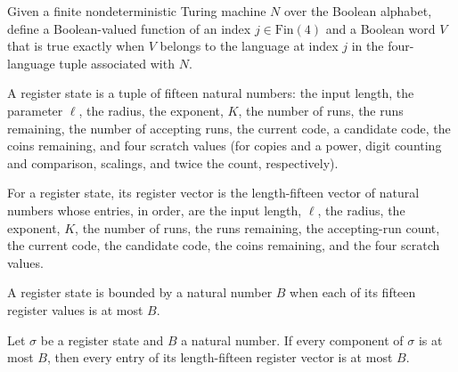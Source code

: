 \begin{definition}
\label{Randomized.PolyAmp.ampOr}
\leanok
{}
Given a finite nondeterministic Turing machine $N$ over the Boolean alphabet, define a
Boolean-valued function of an index $j\in\mathrm{Fin}(4)$ and a Boolean word $V$ that is true
exactly when $V$ belongs to the language at index $j$ in the four-language tuple
associated with $N$.
\end{definition}

\begin{definition}
\label{Randomized.PolyAmp.Reg}
\leanok
A register state is a tuple of fifteen natural numbers: the input length, the parameter
$\ell$, the radius, the exponent, $K$, the number of runs, the runs remaining, the
number of accepting runs, the current code, a candidate code, the coins remaining, and
four scratch values (for copies and a power, digit counting and comparison, scalings,
and twice the count, respectively).
\end{definition}

\begin{definition}
\label{Randomized.PolyAmp.Reg.v}
\leanok
{}
For a register state, its register vector is the length-fifteen vector of natural
numbers whose entries, in order, are the input length, $\ell$, the radius, the exponent,
$K$, the number of runs, the runs remaining, the accepting-run count, the current code,
the candidate code, the coins remaining, and the four scratch values.
\end{definition}

\begin{definition}
\label{Randomized.PolyAmp.Reg.Le}
\leanok
{}
A register state is bounded by a natural number $B$ when each of its fifteen register
values is at most $B$.
\end{definition}

\begin{lemma}
\label{Randomized.PolyAmp.Reg.le_v}
\leanok
{}
Let $\sigma$ be a register state and $B$ a natural number. If every component of
$\sigma$ is at most $B$, then every entry of its length-fifteen register vector is at
most $B$.
\end{lemma}

